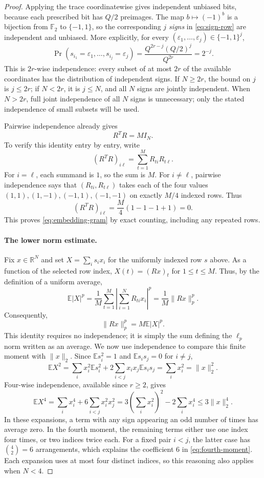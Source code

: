 \documentclass[10pt,a4paper]{amsart}
\newcommand{\E}{\mathbb E}
\newcommand{\F}{\mathbb F}
\newcommand{\R}{\mathbb R}
\begin{document}
\begin{proof}
Applying the trace coordinatewise gives independent unbiased bits, because each prescribed bit has $Q/2$ preimages. The map $b\mapsto(-1)^b$ is a bijection from $\F_2$ to $\{-1,1\}$, so the corresponding \emph{$j$ signs} in \eqref{eq:sign-row} are independent and unbiased. More explicitly, for every $(\varepsilon_1,\ldots,\varepsilon_j)\in\{-1,1\}^j$,
\[
 \Pr(s_{i_1}=\varepsilon_1,\ldots,s_{i_j}=\varepsilon_j)
 =\frac{Q^{2r-j}(Q/2)^j}{Q^{2r}}=2^{-j}.
\]
This is $2r$-wise independence: every subset of at most $2r$ of the available coordinates has the distribution of independent signs. If $N\ge2r$, the bound on $j$ is $j\le2r$; if $N<2r$, it is $j\le N$, and all $N$ signs are jointly independent. When $N>2r$, full joint independence of all $N$ signs is unnecessary; only the stated independence of small subsets will be used.

Pairwise independence already gives
\begin{equation}\label{eq:embedding-gram}
 R^TR=MI_N.
\end{equation}
To verify this identity entry by entry, write
\[
 (R^TR)_{i\ell}=\sum_{t=1}^M R_{ti}R_{t\ell}.
\]
For $i=\ell$, each summand is $1$, so the sum is $M$. For $i\ne\ell$, pairwise independence says that $(R_{ti},R_{t\ell})$ takes each of the four values $(1,1),(1,-1),(-1,1),(-1,-1)$ on exactly $M/4$ indexed rows. Thus
\[
 (R^TR)_{i\ell}=\frac M4(1-1-1+1)=0.
\]
This proves \eqref{eq:embedding-gram} by exact counting, including any repeated rows.

\paragraph{The lower norm estimate.}
Fix $x\in\R^N$ and set $X=\sum_i s_ix_i$ for the uniformly indexed row $s$ above. As a function of the selected row index, $X(t)=(Rx)_t$ for $1\le t\le M$. Thus, by the definition of a uniform average,
\[
 \E|X|^p=\frac1M\sum_{t=1}^M
       \left|\sum_{i=1}^N R_{ti}x_i\right|^p
       =\frac1M\|Rx\|_p^p.
\]
Consequently,
\begin{equation}\label{eq:finite-moment}
 \|Rx\|_p^p=M\E|X|^p.
\end{equation}
This identity requires no independence; it is simply the sum defining the $\ell_p$ norm written as an average. We now use independence to compare this finite moment with $\|x\|_2$. Since $\E s_i^2=1$ and $\E s_is_j=0$ for $i\ne j$,
\[
 \E X^2=\sum_i x_i^2\E s_i^2
             +2\sum_{i<j}x_ix_j\E s_is_j
          =\sum_i x_i^2=\|x\|_2^2.
\]
Four-wise independence, available since $r\ge2$, gives
\begin{equation}\label{eq:fourth-moment}
 \E X^4=\sum_i x_i^4+6\sum_{i<j}x_i^2x_j^2
 =3\left(\sum_i x_i^2\right)^2-2\sum_i x_i^4
 \le3\|x\|_2^4.
\end{equation}
In these expansions, a term with any sign appearing an odd number of times has average zero. In the fourth moment, the remaining terms either use one index four times, or two indices twice each. For a fixed pair $i<j$, the latter case has $\binom42=6$ arrangements, which explains the coefficient $6$ in \eqref{eq:fourth-moment}. Each expansion uses at most four distinct indices, so this reasoning also applies when $N<4$.


\end{proof}
\end{document}
